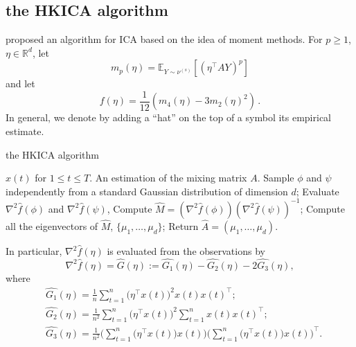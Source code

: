 \documentclass[twoside]{article}
\newcommand{\E}{\mathbb{E}}
\newcommand{\real}{\mathbb{R}}
\theoremstyle{definition}
\begin{document}
\subsection{the HKICA algorithm}
\label{subsec:HKalg}
\citet{DHsu2012} proposed an algorithm for ICA based on the idea of moment methods.
For $p\ge 1$, $\eta\in \real^d$, 
let 
\begin{equation}
\label{eq:momnent}
m_p(\eta) = \E_{Y\sim \nu^{(s)}}[ (\eta^\top A Y)^p ]
\end{equation}
and let
\begin{equation}
\label{eq:funcf}
f(\eta) = \frac1{12} \left( m_4(\eta) - 3 m_2(\eta)^2 \right)\,.
\end{equation}
In general, we denote by adding a ``hat'' on the top of a symbol its empirical estimate.
\begin{algorithm}[H]
\caption{the HKICA algorithm}
\begin{algorithmic}[1]
\INPUT $x(t)$ for $1\le t \le T$. 
\OUTPUT An estimation of the mixing matrix $A$. 
\STATE Sample $\phi$ and $\psi$ independently from a standard Gaussian distribution of dimension $d$;
\STATE Evaluate $\nabla^2\widehat{f}(\phi)$ and $\nabla^2\widehat{f}(\psi)$, 
\STATE Compute $\widehat{M} = (\nabla^2 \widehat{f}(\phi))(\nabla^2\widehat{f}(\psi))^{-1}$;
\STATE Compute all the eigenvectors of $\widehat{M}$, $\{\mu_1,\ldots,\mu_d\}$;
\STATE Return $\widehat{A} = (\mu_1,\ldots,\mu_d)$.
\end{algorithmic}
\end{algorithm}
In particular, $\nabla^2\widehat{f}(\eta)$  is evaluated from the observations by
\begin{equation}
\label{eq:G}
\nabla^2 \widehat{f}(\eta) = \widehat{G}(\eta):= \widehat{G_1}(\eta) - \widehat{G_2}(\eta) -2\widehat{G_3}(\eta),
\end{equation}
where 
\begin{align*}
&\widehat{ G_1}(\eta) = \frac1n\sum_{t=1}^{n} \big(\eta^{\top}x(t)\big)^2x(t)x(t)^{\top}; \\
& \widehat{G_2}(\eta) = \frac{1}{n^2}\sum_{t=1}^{n} \big(\eta^{\top}x(t)\big)^2 \sum_{t=1}^{n}x(t)x(t)^{\top}; \\
& \widehat{G_3}(\eta) = \frac{1}{n^2}\Big(\sum_{t=1}^{n} \big(\eta^{\top}x(t)\big)x(t)\Big) \Big(\sum_{t=1}^{n} \big(\eta^{\top}x(t)\big)x(t)\Big)^{\top}.
\end{align*} 
\end{document}
